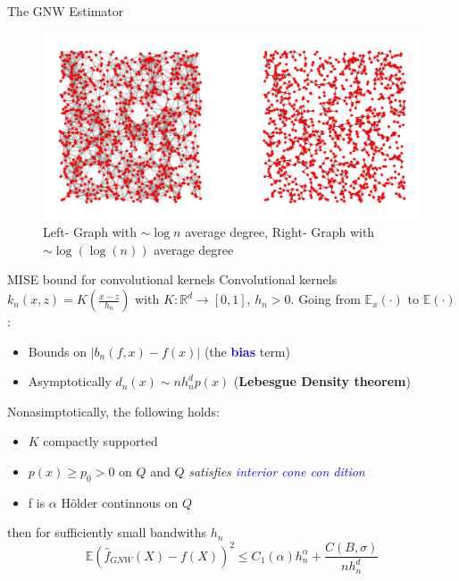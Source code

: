 \documentclass[final,dvipsnames]{beamer}
\newcommand{\myemph}[1]{\textcolor{blue}{#1}}
\newcommand{\myemphh}[1]{\textbf{\textcolor{blue}{#1}}}
\newcommand{\mycolbackwhite}[1]{
\hspace*{.01\linewidth}\begin{minipage}{.96\linewidth}
\begin{mdframed}[backgroundcolor=white!10,linewidth=1pt]
\vspace{10pt}
#1
\vspace{10pt}
\end{mdframed}
\end{minipage}
}
\begin{document}
\begin{frame}
\begin{columns}[T]
\begin{column}{0.38\textwidth}
\begin{block}{The GNW Estimator}
\begin{figure}
    \centering
   \includegraphics[width=1\textwidth]{fresh_for_marseille.png}

    \caption{Left- Graph with $\sim \log n$ average degree, Right- Graph with $\sim \log(\log(n))$ average degree}
    \label{fig:sparse_graphs}
\end{figure}
\end{block}

\begin{block}{MISE bound for convolutional kernels}
Convolutional kernels $k_n(x,z)=K(\frac{x-z}{h_n})$ with $K\colon\mathbb{R}^d\to [0,1]$, $h_n>0$.
\vspace{20pt}
Going from $\mathbb{E}_{x}(\cdot)$ to $\mathbb{E}(\cdot)$:
\vspace{20pt}
\begin{itemize}
    \item Bounds on $|b_n(f,x)-f(x)|$ (the \myemphh{bias} term) 
    \item Asymptotically $d_n(x)\sim nh_n^dp(x)$ (\textbf{Lebesgue Density theorem})
\end{itemize}
\vspace{20pt}
Nonasimptotically, the following holds:
\vspace{20pt}
\mycolbackwhite{
\vspace{20pt}
\begin{itemize}
    \item $K$ compactly supported 
    \item $p(x)\geq p_0>0$ on $Q$ and $Q$ \textit{satisfies \myemph{interior cone con dition}}
    \item f is $\alpha$ Hölder continnous on $Q$
        \end{itemize}

        then for sufficiently small bandwiths $h_n$
        \begin{equation*}
            \mathbb{E}(\hat{f}_{GNW}(X)-f(X))^2\leq C_1(\alpha)h_n^{\alpha}+\frac{C(B,\sigma)}{nh_n^d}
        \end{equation*}
        }
\end{block}
\end{column}


\end{columns}
\end{frame}
\end{document}
